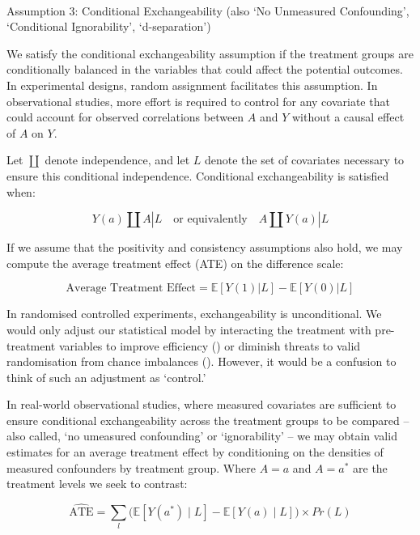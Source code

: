 \documentclass[
  single column]{article}
\makeatletter
\let\oldparagraph\paragraph
\renewcommand{\paragraph}{
    \@ifstar
      \xxxParagraphStar
      \xxxParagraphNoStar
  }
\newcommand{\xxxParagraphStar}[1]{\oldparagraph*{#1}\mbox{}}
\newcommand{\xxxParagraphNoStar}[1]{\oldparagraph{#1}\mbox{}}
\makeatother
\begin{document}
\paragraph{Assumption 3: Conditional Exchangeability (also `No
Unmeasured Confounding', `Conditional Ignorability',
`d-separation')}\label{assumption-3-conditional-exchangeability-also-no-unmeasured-confounding-conditional-ignorability-d-separation}

We satisfy the conditional exchangeability assumption if the treatment
groups are conditionally balanced in the variables that could affect the
potential outcomes. In experimental designs, random assignment
facilitates this assumption. In observational studies, more effort is
required to control for any covariate that could account for observed
correlations between \(A\) and \(Y\) without a causal effect of \(A\) on
\(Y\).

Let \(\coprod\) denote independence, and let \(L\) denote the set of
covariates necessary to ensure this conditional independence.
Conditional exchangeability is satisfied when:

\[
Y(a) \coprod A | L \quad \text{or equivalently} \quad A \coprod Y(a) | L
\]

If we assume that the positivity and consistency assumptions also hold,
we may compute the average treatment effect (ATE) on the difference
scale:

\[
\text{Average Treatment Effect} = \mathbb{E}[Y(1) | L] - \mathbb{E}[Y(0) | L]
\]

In randomised controlled experiments, exchangeability is unconditional.
We would only adjust our statistical model by interacting the treatment
with pre-treatment variables to improve efficiency
() or diminish
threats to valid randomisation from chance imbalances
(). However, it
would be a confusion to think of such an adjustment as `control.'

In real-world observational studies, where measured covariates are
sufficient to ensure conditional exchangeability across the treatment
groups to be compared -- also called, `no umeasured confounding' or
`ignorability' -- we may obtain valid estimates for an average treatment
effect by conditioning on the densities of measured confounders by
treatment group. Where \(A = a\) and \(A = a^*\) are the treatment
levels we seek to contrast:

\[
\widehat{\text{ATE}} =  \sum_l \big( \mathbb{E}[Y(a^*) \mid L] - \mathbb{E}[Y(a) \mid L] \big) \times Pr(L)
\]
\end{document}
